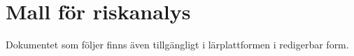 \documentclass[a4paper]{llncs}
\begin{document}
%
%
%
%
\section{Mall för riskanalys}
\label{app:riskanalys}

Dokumentet som följer finns även tillgängligt i lärplattformen i redigerbar 
form.


\end{document}
